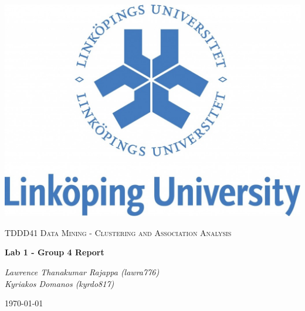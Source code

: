 \documentclass[a4paper,10pt]{article}
\begin{document}
\begin{titlepage}
	\centering
	\includegraphics[width=.6\textwidth]{liu-logo.png}\par
	\vfill
	{\scshape\Large TDDD41 Data Mining - Clustering and Association Analysis\par}
	{\huge\bfseries Lab 1 -  Group 4 Report\par}
	\vspace{0.5cm}
    {\large\itshape Lawrence Thanakumar Rajappa (lawra776)\\
     \large\itshape Kyriakos Domanos (kyrdo817)\par}
	\vfill
	{\large \today\par}
\end{titlepage}
\end{document}
